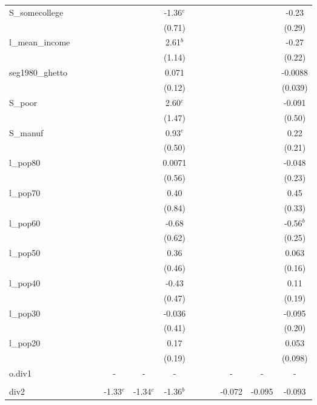 \documentclass[]{article}
\begin{document}
\begin{tabular}{lcccccccccccc}
S\_somecollege &  &  &  &  &  & -1.36$^c$ &  &  &  &  &  & -0.23 \\
 &  &  &  &  &  & (0.71) &  &  &  &  &  & (0.29) \\
l\_mean\_income &  &  &  &  &  & 2.61$^b$ &  &  &  &  &  & -0.27 \\
 &  &  &  &  &  & (1.14) &  &  &  &  &  & (0.22) \\
seg1980\_ghetto &  &  &  &  &  & 0.071 &  &  &  &  &  & -0.0088 \\
 &  &  &  &  &  & (0.12) &  &  &  &  &  & (0.039) \\
S\_poor &  &  &  &  &  & 2.60$^c$ &  &  &  &  &  & -0.091 \\
 &  &  &  &  &  & (1.47) &  &  &  &  &  & (0.50) \\
S\_manuf &  &  &  &  &  & 0.93$^c$ &  &  &  &  &  & 0.22 \\
 &  &  &  &  &  & (0.50) &  &  &  &  &  & (0.21) \\
l\_pop80 &  &  &  &  &  & 0.0071 &  &  &  &  &  & -0.048 \\
 &  &  &  &  &  & (0.56) &  &  &  &  &  & (0.23) \\
l\_pop70 &  &  &  &  &  & 0.40 &  &  &  &  &  & 0.45 \\
 &  &  &  &  &  & (0.84) &  &  &  &  &  & (0.33) \\
l\_pop60 &  &  &  &  &  & -0.68 &  &  &  &  &  & -0.56$^b$ \\
 &  &  &  &  &  & (0.62) &  &  &  &  &  & (0.25) \\
l\_pop50 &  &  &  &  &  & 0.36 &  &  &  &  &  & 0.063 \\
 &  &  &  &  &  & (0.46) &  &  &  &  &  & (0.16) \\
l\_pop40 &  &  &  &  &  & -0.43 &  &  &  &  &  & 0.11 \\
 &  &  &  &  &  & (0.47) &  &  &  &  &  & (0.19) \\
l\_pop30 &  &  &  &  &  & -0.036 &  &  &  &  &  & -0.095 \\
 &  &  &  &  &  & (0.41) &  &  &  &  &  & (0.20) \\
l\_pop20 &  &  &  &  &  & 0.17 &  &  &  &  &  & 0.053 \\
 &  &  &  &  &  & (0.19) &  &  &  &  &  & (0.098) \\
o.div1 &  &  &  & - & - & - &  &  &  & - & - & - \\
 &  &  &  &  &  &  &  &  &  &  &  &  \\
div2 &  &  &  & -1.33$^c$ & -1.34$^c$ & -1.36$^b$ &  &  &  & -0.072 & -0.095 & -0.093 \\

\end{tabular}
\end{document}

